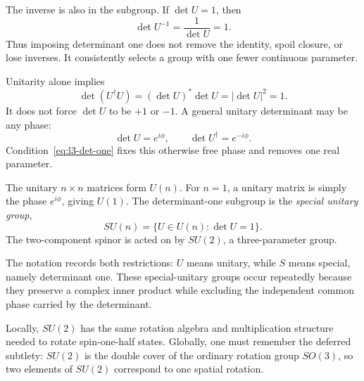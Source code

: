 The inverse is also in the subgroup. If \(\det U=1\), then
\begin{equation}
\det U^{-1}=\frac{1}{\det U}=1.
\end{equation}
Thus imposing determinant one does not remove the identity, spoil closure, or
lose inverses. It consistently selects a group with one fewer continuous
parameter.

Unitarity alone implies
\begin{equation}
\det(U^\dagger U)=
(\det U)^*\det U
=|\det U|^2=1.
\end{equation}
It does not force \(\det U\) to be \(+1\) or \(-1\). A general unitary
determinant may be any phase:
\begin{equation}
\det U=e^{i\phi},
\qquad
\det U^\dagger=e^{-i\phi}.
\end{equation}
Condition~\eqref{eq:l3-det-one} fixes this otherwise free phase and removes one
real parameter.

\begin{classroomqa}
\end{classroomqa}

The unitary \(n\times n\) matrices form \(U(n)\). For \(n=1\), a unitary
matrix is simply the phase \(e^{i\phi}\), giving \(U(1)\). The determinant-one
subgroup is the \emph{special unitary group},
\begin{equation}
SU(n)=\{U\in U(n):\det U=1\}.
\end{equation}
The two-component spinor is acted on by \(SU(2)\), a three-parameter group.

The notation records both restrictions: \(U\) means unitary, while \(S\)
means special, namely determinant one. These special-unitary groups occur
repeatedly because they preserve a complex inner product while excluding the
independent common phase carried by the determinant.

Locally, \(SU(2)\) has the same rotation algebra and multiplication structure
needed to rotate spin-one-half states. Globally, one must remember the
deferred subtlety: \(SU(2)\) is the double cover of the ordinary rotation group
\(SO(3)\), so two elements of \(SU(2)\) correspond to one spatial rotation.


